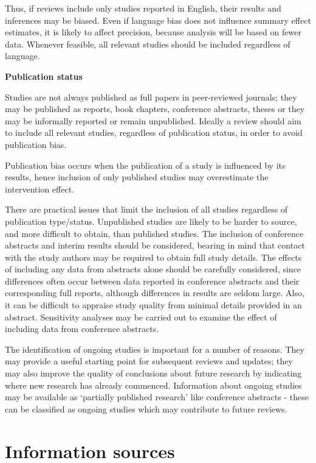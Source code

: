 \documentclass[
  11pt,
  a4paper,
  DIV=11,
  numbers=noendperiod]{scrreprt}
\begin{document}
Thus, if reviews include only studies reported in English, their results
and inferences may be biased. Even if language bias does not influence
summary effect estimates, it is likely to affect precision, because
analysis will be based on fewer data. Whenever feasible, all relevant
studies should be included regardless of language.

\textbf{Publication status}

Studies are not always published as full papers in peer-reviewed
journals; they may be published as reports, book chapters, conference
abstracts, theses or they may be informally reported or remain
unpublished. Ideally a review should aim to include all relevant
studies, regardless of publication status, in order to avoid publication
bias.

Publication bias occurs when the publication of a study is influenced by
its results, hence inclusion of only published studies may overestimate
the intervention effect.

There are practical issues that limit the inclusion of all studies
regardless of publication type/status. Unpublished studies are likely to
be harder to source, and more difficult to obtain, than published
studies. The inclusion of conference abstracts and interim results
should be considered, bearing in mind that contact with the study
authors may be required to obtain full study details. The effects of
including any data from abstracts alone should be carefully considered,
since differences often occur between data reported in conference
abstracts and their corresponding full reports, although differences in
results are seldom large. Also, it can be difficult to appraise study
quality from minimal details provided in an abstract. Sensitivity
analyses may be carried out to examine the effect of including data from
conference abstracts.

The identification of ongoing studies is important for a number of
reasons. They may provide a useful starting point for subsequent reviews
and updates; they may also improve the quality of conclusions about
future research by indicating where new research has already commenced.
Information about ongoing studies may be available as `partially
published research' like conference abstracts - these can be classified
as ongoing studies which may contribute to future reviews.

\section{Information sources}\label{information-sources}
\end{document}
